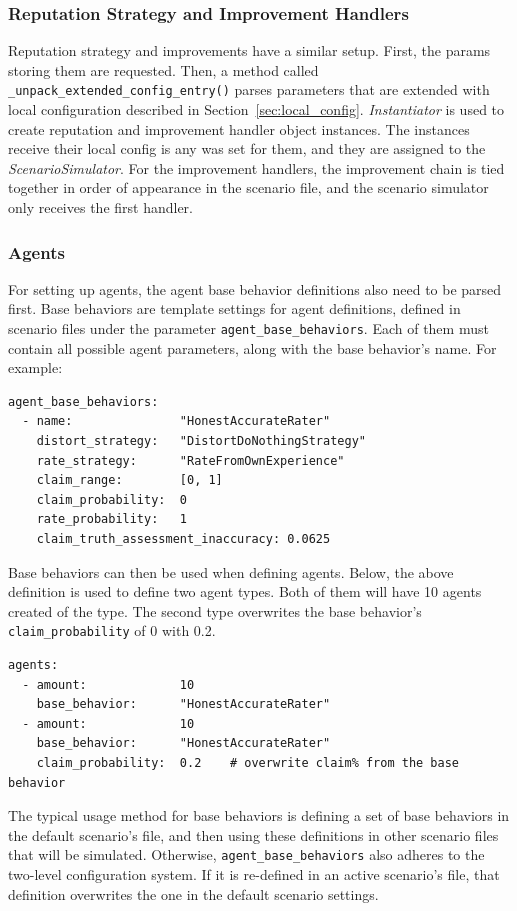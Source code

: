 \documentclass[%
    ]{\PathToTumTemplate/thesis/tum_thesis}
\begin{document}
\subsubsection{Reputation Strategy and Improvement Handlers}
Reputation strategy and improvements have a similar setup.
First, the params storing them are requested.
Then, a method called \lstinline{_unpack_extended_config_entry()} parses parameters that are extended with local configuration described in Section~\ref{sec:local_config}.
\emph{Instantiator} is used to create reputation and improvement handler object instances.
The instances receive their local config is any was set for them, and they are assigned to the \emph{ScenarioSimulator}.
For the improvement handlers, the improvement chain is tied together in order of appearance in the scenario file, and the scenario simulator only receives the first handler.

\subsubsection{Agents}
For setting up agents, the agent base behavior definitions also need to be parsed first.
Base behaviors are template settings for agent definitions, defined in scenario files under the parameter \lstinline{agent_base_behaviors}.
Each of them must contain all possible agent parameters, along with the base behavior's name.
For example:
\begin{lstlisting}
agent_base_behaviors:
  - name: 				"HonestAccurateRater"
    distort_strategy: 	"DistortDoNothingStrategy"
    rate_strategy: 		"RateFromOwnExperience"
    claim_range: 		[0, 1]
    claim_probability: 	0
    rate_probability: 	1
    claim_truth_assessment_inaccuracy: 0.0625
\end{lstlisting}
Base behaviors can then be used when defining agents. Below, the above definition is used to define two agent types. Both of them will have 10 agents created of the type. The second type overwrites the base behavior's \lstinline{claim_probability} of 0 with 0.2.
\begin{lstlisting}
agents:
  - amount: 			10
  	base_behavior: 		"HonestAccurateRater"
  - amount: 			10
  	base_behavior: 		"HonestAccurateRater"
  	claim_probability: 	0.2    # overwrite claim% from the base behavior
\end{lstlisting}
The typical usage method for base behaviors is defining a set of base behaviors in the default scenario's file, and then using these definitions in other scenario files that will be simulated.
Otherwise, \lstinline{agent_base_behaviors} also adheres to the two-level configuration system.
If it is re-defined in an active scenario's file, that definition overwrites the one in the default scenario settings.
\end{document}
